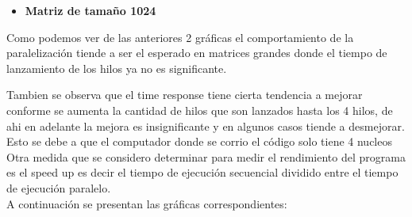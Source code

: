 \documentclass{IEEEtran}
\begin{document}
\begin{itemize}


\item \textbf{Matriz de tamaño 1024}

\end{itemize}

Como podemos ver de las anteriores 2 gráficas el comportamiento de la
 paralelización tiende a ser el esperado en matrices grandes donde el 
 tiempo de  lanzamiento de los hilos  ya no es significante.

Tambien  se  observa que el time response  tiene cierta tendencia a  mejorar conforme se aumenta la cantidad de hilos que son lanzados hasta los 4 hilos, de ahi en adelante la mejora es insignificante y en algunos casos tiende a desmejorar.
Esto se debe a que el computador donde se corrio el código solo tiene 4 nucleos\\

Otra medida que se considero determinar para medir el rendimiento del programa es el speed up es decir el tiempo de ejecución secuencial dividido entre el tiempo de ejecución paralelo. \\
A continuación se presentan las gráficas correspondientes:
\end{document}
